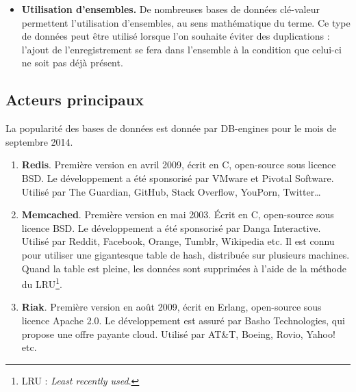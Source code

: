 \begin{itemize}
	 	\item \textbf{Utilisation d'ensembles.} De nombreuses bases de données clé-valeur permettent l'utilisation d'ensembles, au sens mathématique du terme. Ce type de données peut être utilisé lorsque l'on souhaite éviter des duplications : l'ajout de l'enregistrement se fera dans l'ensemble à la condition que celui-ci ne soit pas déjà présent.
	 \end{itemize} 

\subsection{Acteurs principaux}
	La popularité des bases de données est donnée par DB-engines\cite{db_engines_key_value} pour le mois de septembre 2014.

	\begin{enumerate}
		\item \textbf{Redis}. Première version en avril 2009, écrit en C, open-source sous licence BSD. Le développement a été sponsorisé par VMware et Pivotal Software. Utilisé par The Guardian, GitHub, Stack Overflow, YouPorn, Twitter\dots\cite{Wikipedia_redis}
		\item \textbf{Memcached}. Première version en mai 2003. Écrit en C, open-source sous licence BSD. Le développement a été sponsorisé par Danga Interactive. Utilisé par Reddit, Facebook, Orange, Tumblr, Wikipedia etc. Il est connu pour utiliser une gigantesque table de hash, distribuée sur plusieurs machines. Quand la table est pleine, les données sont supprimées à l'aide de la méthode du LRU\footnote{LRU : \textit{Least recently used}.}.\cite{Wikipedia_memcached}
		\item \textbf{Riak}. Première version en août 2009, écrit en Erlang, open-source sous licence Apache 2.0. Le développement est assuré par Basho Technologies, qui propose une offre payante cloud. Utilisé par AT\&T, Boeing, Rovio, Yahoo! etc.\cite{Wikipedia_riak}
	\end{enumerate}

